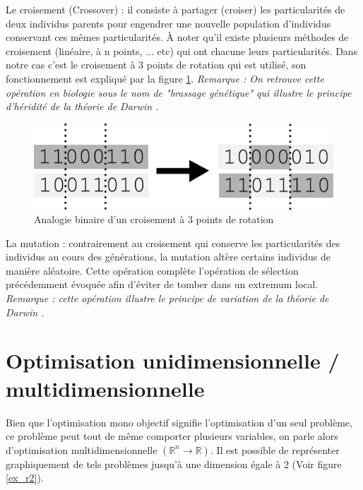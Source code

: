 \documentclass[12pt]{report}
\begin{document}
        Le croisement (Crossover) :
          il consiste à partager (croiser) les particularités de deux individus parents pour engendrer une nouvelle population d'individus conservant ces mêmes particularités. À noter qu'il existe plusieurs méthodes de croisement (linéaire, à n points, ... etc) qui ont chacune leurs particularités. Dans notre cas c'est le croisement à 3 points de rotation qui est utilisé, son fonctionnement est expliqué par la figure \ref{sch_crossover}.
          \emph{Remarque : On retrouve cette opération en biologie sous le nom de "brassage génétique" qui illustre le principe d'héridité de la théorie de Darwin \cite{darwin}.}
          \begin{figure}[h]
            \centering
            \includegraphics{img/crossover.png}
            \caption{Analogie binaire d'un croisement à 3 points de rotation}
            \label{sch_crossover}
          \end{figure}

        La mutation \cite{wiki6} :
          contrairement au croisement qui conserve les particularités des individus au cours des générations, la mutation altère certains individus de manière aléatoire. Cette opération complète l'opération de sélection précédemment évoquée afin d'éviter de tomber dans un extremum local.
          \emph{Remarque : cette opération illustre le principe de variation de la théorie de Darwin \cite{darwin}.}

    \section{Optimisation unidimensionnelle / multidimensionnelle}
      Bien que l'optimisation mono objectif signifie l'optimisation d'un seul problème, ce problème peut tout de même comporter plusieurs variables, on parle alors d'optimisation multidimensionnelle $(\mathbb{R}^n \rightarrow \mathbb{R})$. Il est possible de représenter graphiquement de tels problèmes jusqu'à une dimension égale à 2 (Voir figure \ref{ex_r2}).
\end{document}

